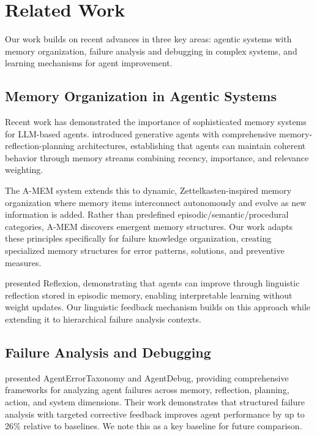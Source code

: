 \documentclass[11pt]{article}
\begin{document}
\section{Related Work}

Our work builds on recent advances in three key areas: agentic systems with memory organization, failure analysis and debugging in complex systems, and learning mechanisms for agent improvement.

\subsection{Memory Organization in Agentic Systems}

Recent work has demonstrated the importance of sophisticated memory systems for LLM-based agents. \citet{Park2023} introduced generative agents with comprehensive memory-reflection-planning architectures, establishing that agents can maintain coherent behavior through memory streams combining recency, importance, and relevance weighting.

The A-MEM system \citep{AMEM2025} extends this to dynamic, Zettelkasten-inspired memory organization where memory items interconnect autonomously and evolve as new information is added. Rather than predefined episodic/semantic/procedural categories, A-MEM discovers emergent memory structures. Our work adapts these principles specifically for failure knowledge organization, creating specialized memory structures for error patterns, solutions, and preventive measures.

\citet{Shinn2023} presented Reflexion, demonstrating that agents can improve through linguistic reflection stored in episodic memory, enabling interpretable learning without weight updates. Our linguistic feedback mechanism builds on this approach while extending it to hierarchical failure analysis contexts.

\subsection{Failure Analysis and Debugging}

\citet{Zhu2025} presented AgentErrorTaxonomy and AgentDebug, providing comprehensive frameworks for analyzing agent failures across memory, reflection, planning, action, and system dimensions. Their work demonstrates that structured failure analysis with targeted corrective feedback improves agent performance by up to 26\% relative to baselines. We note this as a key baseline for future comparison.
\end{document}
